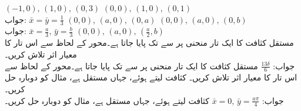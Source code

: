 $(-1,0),\, (1,0),\,(0,3)$
$(0,0),\, (1,0),\,(0,1)$\\
جواب:\quad
$\bar{x}=\bar{y}=\tfrac{1}{3}$
$(0,0),\, (a,0),\,(0,a)$
$(0,0),\, (a,0),\,(0,b)$\\
جواب:\quad
$\bar{x}=\tfrac{a}{3},\,\bar{y}=\tfrac{b}{3}$
$(0,0),\, (a,0),\,(\tfrac{a}{2},b)$
\\
مستقل کثافت کا ایک تار منحنی  پر  سے  تک پایا جاتا ہے۔محور  کے لحاظ سے اس تار کا معیار اثر تلاش کریں۔\\
جواب:\quad
$\tfrac{13\delta}{6}$
مستقل کثافت کا ایک تار منحنی  پر  سے  تک پایا جاتا ہے۔محور  کے لحاظ سے اس تار کا معیار اثر تلاش کریں۔
کثافت  لیتے ہوئے، جہاں  مستقل ہے، مثال  کو دوبارہ حل کریں۔\\
جواب:\quad
$\bar{x}=0,\,\bar{y}=\tfrac{a\pi}{4}$
کثافت  لیتے ہوئے، جہاں  مستقل ہے، مثال  کو دوبارہ حل کریں۔
